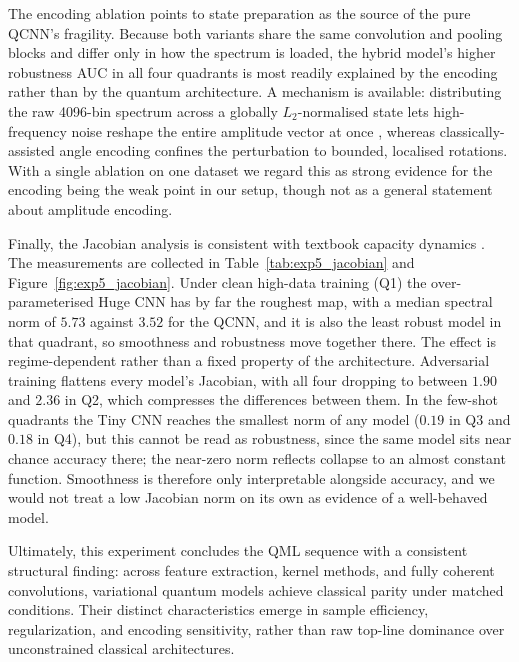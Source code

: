 The encoding ablation points to state preparation as the source of the pure
QCNN's fragility. Because both variants share the same convolution and pooling
blocks and differ only in how the spectrum is loaded, the hybrid model's higher
robustness AUC in all four quadrants is most readily explained by the encoding
rather than by the quantum architecture. A mechanism is available: distributing
the raw 4096-bin spectrum across a globally $L_2$-normalised state lets
high-frequency noise reshape the entire amplitude vector at once
\cite{schuld2021encoding}, whereas classically-assisted angle encoding confines
the perturbation to bounded, localised rotations. With a single ablation on one
dataset we regard this as strong evidence for the encoding being the weak point
in our setup, though not as a general statement about amplitude encoding.

Finally, the Jacobian analysis is consistent with textbook capacity dynamics
\cite{szegedy2013intriguing, sokolic2017robust}. The measurements are collected
in Table~\ref{tab:exp5_jacobian} and Figure~\ref{fig:exp5_jacobian}. Under clean
high-data training (Q1) the over-parameterised Huge CNN has by far the roughest
map, with a median spectral norm of $5.73$ against $3.52$ for the QCNN, and it is
also the least robust model in that quadrant, so smoothness and robustness move
together there. The effect is regime-dependent rather than a fixed property of
the architecture. Adversarial training flattens every model's Jacobian, with all
four dropping to between $1.90$ and $2.36$ in Q2, which compresses the
differences between them. In the few-shot quadrants the Tiny CNN reaches the
smallest norm of any model ($0.19$ in Q3 and $0.18$ in Q4), but this cannot be
read as robustness, since the same model sits near chance accuracy there; the
near-zero norm reflects collapse to an almost constant function. Smoothness is
therefore only interpretable alongside accuracy, and we would not treat a low
Jacobian norm on its own as evidence of a well-behaved model.

Ultimately, this experiment concludes the QML sequence with a consistent structural finding: across feature extraction, kernel methods, and fully coherent convolutions, variational quantum models achieve classical parity under matched conditions. Their distinct characteristics emerge in sample efficiency, regularization, and encoding sensitivity, rather than raw top-line dominance over unconstrained classical architectures.

